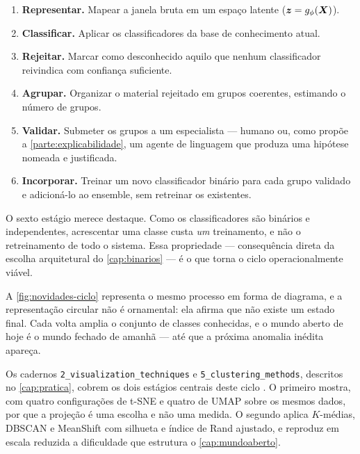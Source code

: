 \begin{enumerate}[leftmargin=*,itemsep=0.3em]
  \item \textbf{Representar.} Mapear a janela bruta em um espaço latente
        ($\bm{z} = g_{\phi}(\bm{X})$).
  \item \textbf{Classificar.} Aplicar os classificadores da base de conhecimento atual.
  \item \textbf{Rejeitar.} Marcar como desconhecido aquilo que nenhum classificador
        reivindica com confiança suficiente.
  \item \textbf{Agrupar.} Organizar o material rejeitado em grupos coerentes,
        estimando o número de grupos.
  \item \textbf{Validar.} Submeter os grupos a um especialista --- humano ou, como
        propõe a \cref{parte:explicabilidade}, um agente de linguagem que produza uma
        hipótese nomeada e justificada.
  \item \textbf{Incorporar.} Treinar um novo classificador binário para cada grupo
        validado e adicioná-lo ao ensemble, sem retreinar os existentes.
\end{enumerate}

O sexto estágio merece destaque. Como os classificadores são binários e independentes,
acrescentar uma classe custa \emph{um} treinamento, e não o retreinamento de todo o
sistema. Essa propriedade --- consequência direta da escolha arquitetural do
\cref{cap:binarios} --- é o que torna o ciclo operacionalmente viável.

A \cref{fig:novidades-ciclo} representa o mesmo processo em forma de diagrama, e a
representação circular não é ornamental: ela afirma que não existe um estado final. Cada
volta amplia o conjunto de classes conhecidas, e o mundo aberto de hoje é o mundo fechado
de amanhã --- até que a próxima anomalia inédita apareça.

\begin{destaque}[Prática]
Os cadernos \texttt{2\_visualization\_techniques} e \texttt{5\_clustering\_methods},
descritos no \cref{cap:pratica}, cobrem os dois estágios centrais deste ciclo
\citep{Lopes2026Intro3W}. O primeiro mostra, com quatro configurações de t-SNE e quatro
de UMAP sobre os mesmos dados, por que a projeção é uma escolha e não uma medida. O
segundo aplica $K$-médias, DBSCAN e MeanShift com silhueta e índice de Rand ajustado, e
reproduz em escala reduzida a dificuldade que estrutura o \cref{cap:mundoaberto}.
\end{destaque}


